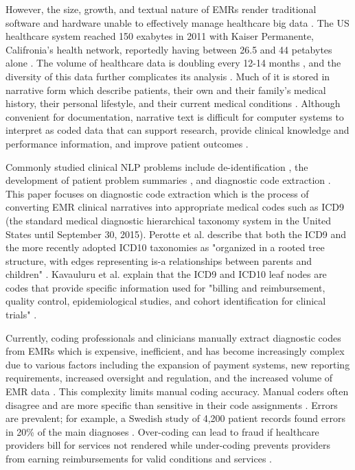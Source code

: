 \documentclass[sigconf]{acmart}
\begin{document}
However, the size, growth, and textual nature of EMRs render traditional software and hardware unable to effectively manage healthcare big data \cite{raghupathi2014big}. The US healthcare system reached 150 exabytes in 2011 with Kaiser Permanente, Califronia's health network, reportedly having between 26.5 and 44 petabytes alone \cite{cottle2013transforming}. The volume of healthcare data is doubling every 12-14 months \cite{dinov2016volume}, and the diversity of this data further complicates its analysis \cite{frost2015drowning}. Much of it is stored in narrative form which describe patients, their own and their family's medical history, their personal lifestyle, and their current medical conditions \cite{meystre2008extracting}. Although convenient for documentation, narrative text is difficult for computer systems to interpret as coded data that can support research, provide clinical knowledge and performance information, and improve patient outcomes \cite{meystre2008extracting} \cite{stanfill2010systematic}.

Commonly studied clinical NLP problems include de-identification \cite{velupillai2015recent}, the development of patient problem summaries \cite{diomaiuta2017novel}, and diagnostic code extraction \cite{perotte2013diagnosis}. This paper focuses on diagnostic code extraction which is the process of converting EMR clinical narratives into appropriate medical codes such as ICD9 (the standard medical diagnostic hierarchical taxonomy system in the United States until September 30, 2015). Perotte et al. describe that both the ICD9 and the more recently adopted ICD10 taxonomies as "organized in a rooted tree structure, with edges representing is-a relationships between parents and children" \cite{perotte2013diagnosis}. Kavauluru et al. explain that the ICD9 and ICD10 leaf nodes are codes that provide specific information used for "billing and reimbursement, quality control, epidemiological studies, and cohort identification for clinical trials" \cite{kavuluru2015empirical}.

Currently, coding professionals and clinicians manually extract diagnostic codes from EMRs which is expensive, inefficient, and has become increasingly complex due to various factors including the expansion of payment systems, new reporting requirements, increased oversight and regulation, and the increased volume of EMR data \cite{AHIMA} \cite{pons2016natural} \cite{stanfill2010systematic} \cite{velupillai2015recent}. This complexity limits manual coding accuracy. Manual coders often disagree \cite{pestian2007shared} and are more specific than sensitive in their code assignments \cite{birman2005accuracy}. Errors are prevalent; for example, a Swedish study of 4,200 patient records found errors in 20\% of the main diagnoses \cite{velupillai2015recent}. Over-coding can lead to fraud if healthcare providers bill for services not rendered while under-coding prevents providers from earning reimbursements for valid conditions and services \cite{perotte2013diagnosis}.
\end{document}
